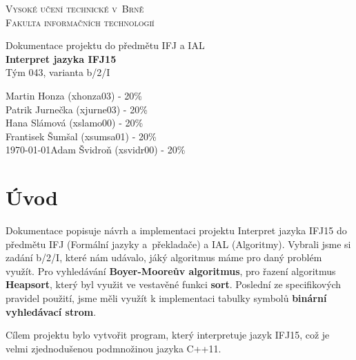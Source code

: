 \documentclass[a4paper, 11pt, titlepage]{article}
\begin{document}

\begin{titlepage} %
\begin{center}
\textsc{\Huge{Vysoké učení technické v~Brně}\\[3mm]\huge{Fakulta informačních technologií}}\\


\begin{figure}[h]
	\centering
\end{figure}

\huge{Dokumentace projektu do předmětu IFJ a IAL}\\
\Huge{\textbf{Interpret jazyka IFJ15}}\\
\LARGE{Tým 043, varianta b/2/I}
\end{center}

{\noindent\Large \hfill Martin Honza (xhonza03) - 20\%\\}
{\indent\Large \hfill Patrik Jurnečka (xjurne03) - 20\%\\}
{\indent\Large \hfill Hana Slámová (xslamo00) - 20\%\\}
{\indent\Large \hfill Frantisek Šumšal (xsumsa01) - 20\%\\}
{\indent\Large\today \hfill Adam Švidroň (xsvidr00) - 20\%}

\end{titlepage}

\tableofcontents

\newpage

\section{Úvod} %
Dokumentace popisuje návrh a implementaci projektu Interpret jazyka IFJ15 do předmětu IFJ (Formální jazyky a~překladače) a IAL (Algoritmy). Vybrali jsme si zadání b/2/I, které nám udávalo, jáký algoritmus máme pro daný problém využít. Pro vyhledávání \textbf{Boyer-Mooreův algoritmus}, pro řazení algoritmus \textbf{Heapsort}, který byl využit ve vestavěné funkci \textbf{sort}. Poslední ze specifikových pravidel použití, jsme měli využít k implementaci tabulky symbolů \textbf{binární vyhledávací strom}. 

Cílem projektu bylo vytvořit program, který interpretuje jazyk IFJ15, což je velmi zjednodušenou podmnožinou jazyka C++11. 
\end{document}
